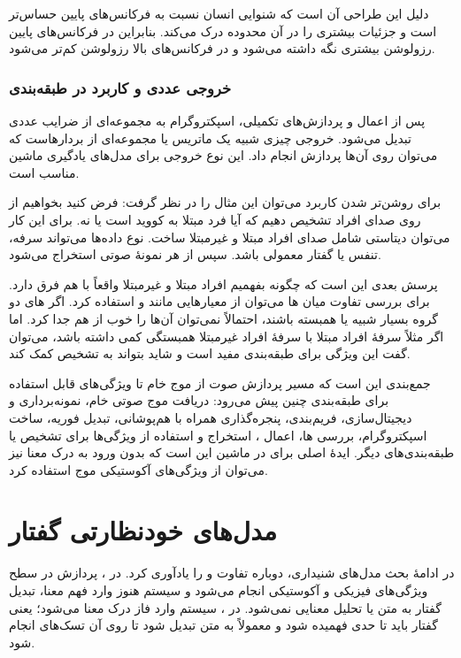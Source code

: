 دلیل این طراحی آن است که شنوایی انسان نسبت به فرکانس‌های پایین حساس‌تر است و جزئیات بیشتری را در آن محدوده درک می‌کند. بنابراین در فرکانس‌های پایین رزولوشن بیشتری نگه داشته می‌شود و در فرکانس‌های بالا رزولوشن کم‌تر می‌شود.


\subsubsection{خروجی عددی و کاربرد در طبقه‌بندی}
پس از اعمال  و پردازش‌های تکمیلی، اسپکتروگرام به مجموعه‌ای از ضرایب عددی تبدیل می‌شود. خروجی  چیزی شبیه یک ماتریس یا مجموعه‌ای از بردارهاست که می‌توان روی آن‌ها پردازش انجام داد. این نوع خروجی برای مدل‌های یادگیری ماشین مناسب است.

برای روشن‌تر شدن کاربرد  می‌توان این مثال را در نظر گرفت: فرض کنید بخواهیم از روی صدای افراد تشخیص دهیم که آیا فرد مبتلا به کووید است یا نه. برای این کار می‌توان دیتاستی شامل صدای افراد مبتلا و غیرمبتلا ساخت. نوع داده‌ها می‌تواند سرفه، تنفس یا گفتار معمولی باشد. سپس از هر نمونهٔ صوتی  استخراج می‌شود.

پرسش بعدی این است که چگونه بفهمیم  افراد مبتلا و غیرمبتلا واقعاً با هم فرق دارد. برای بررسی تفاوت میان ها می‌توان از معیارهایی مانند  و  استفاده کرد. اگر های دو گروه بسیار شبیه یا همبسته باشند، احتمالاً نمی‌توان آن‌ها را خوب از هم جدا کرد. اما اگر مثلاً  سرفهٔ افراد مبتلا با  سرفهٔ افراد غیرمبتلا همبستگی کمی داشته باشد، می‌توان گفت این ویژگی برای طبقه‌بندی مفید است و شاید بتواند به تشخیص کمک کند.

جمع‌بندی این است که مسیر پردازش صوت از موج خام تا ویژگی‌های قابل استفاده برای طبقه‌بندی چنین پیش می‌رود: دریافت موج صوتی خام، نمونه‌برداری و دیجیتال‌سازی، فریم‌بندی، پنجره‌گذاری همراه با هم‌پوشانی، تبدیل فوریه، ساخت اسپکتروگرام، بررسی ها، اعمال ، استخراج  و استفاده از ویژگی‌ها برای تشخیص  یا طبقه‌بندی‌های دیگر. ایدهٔ اصلی برای  در ماشین این است که بدون ورود به درک معنا نیز می‌توان از ویژگی‌های آکوستیکی موج استفاده کرد.

\section{مدل‌های خودنظارتی گفتار}
در ادامهٔ بحث مدل‌های شنیداری، دوباره تفاوت  و  را یادآوری کرد. در ، پردازش در سطح ویژگی‌های فیزیکی و آکوستیکی انجام می‌شود و سیستم هنوز وارد فهم معنا، تبدیل گفتار به متن یا تحلیل معنایی نمی‌شود. در ، سیستم وارد فاز درک معنا می‌شود؛ یعنی گفتار باید تا حدی فهمیده شود و معمولاً به متن تبدیل شود تا روی آن تسک‌های  انجام شود.


